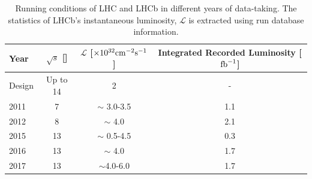



\begin{table}[!h]
	\centering
	\hspace*{-0.8cm}
	\begin{tabular}{l c c c }
		\toprule
		Year & $\sqrt{s}$ [\tev] & $\mathcal{L}$ [$\times10^{32} \rm{cm^{-2}s^{-1}}$] & Integrated Recorded Luminosity [$\rm{fb}^{-1}$] \\ \hline
		Design & Up to 14 & 2 & - \\
		2011 & 7 & $\sim$ 3.0-3.5 & 1.1 \\
		2012 & 8 & $\sim$ 4.0 & 2.1 \\
		2015 & 13 & $\sim$ 0.5-4.5 & 0.3 \\      
		2016 & 13 & $\sim$ 4.0 & 1.7  \\      
		2017 & 13 & $\sim$4.0-6.0 & 1.7 \\\bottomrule      
	\end{tabular}
	\caption{Running conditions of \gls{LHC} and \Gls{LHCb} in different years of data-taking. The statistics of \gls{LHCb}'s instantaneous luminosity, $\mathcal{L}$ is extracted using run database information.}
	\label{tab:runcond}
\end{table}   

